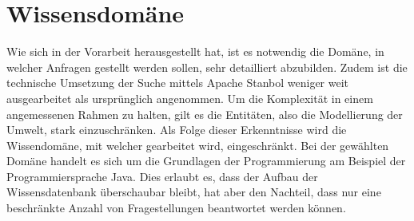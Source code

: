 \chapter{Wissensdomäne}
\label{chap:wissensdomäne}
Wie sich in der Vorarbeit herausgestellt hat, ist es notwendig die Domäne, in welcher Anfragen gestellt werden sollen, sehr detailliert abzubilden. Zudem ist die technische Umsetzung der Suche mittels Apache Stanbol weniger weit ausgearbeitet als ursprünglich angenommen. Um die Komplexität in einem angemessenen Rahmen zu halten, gilt es die Entitäten, also die Modellierung der Umwelt, stark einzuschränken.
Als Folge dieser Erkenntnisse wird die Wissendomäne, mit welcher gearbeitet wird, eingeschränkt. Bei der gewählten Domäne handelt es sich um die Grundlagen der Programmierung am Beispiel der Programmiersprache Java. Dies erlaubt es, dass der Aufbau der Wissensdatenbank überschaubar bleibt, hat aber den Nachteil, dass nur eine beschränkte Anzahl von Fragestellungen beantwortet werden können.
